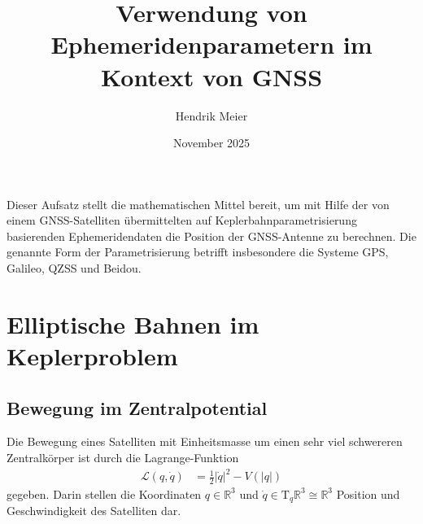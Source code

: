 \documentclass[10pt,a4paper]{article}
\title{Verwendung von Ephemeridenparametern im Kontext von GNSS}
\author{Hendrik Meier}
\affil{Oberuhldingen}
\date{November 2025}
\begin{document}
\maketitle

Dieser Aufsatz stellt die mathematischen Mittel bereit, um mit Hilfe der von einem GNSS-Satelliten übermittelten auf Keplerbahn\-parametrisierung basierenden Ephemeridendaten die Position der GNSS-Antenne zu berechnen.
Die genannte Form der Parametrisierung betrifft insbesondere die Systeme GPS, Galileo, QZSS und Beidou.


\section{Elliptische Bahnen im Keplerproblem}

\subsection{Bewegung im Zentralpotential}

Die Bewegung eines Satelliten mit Einheitsmasse um einen sehr viel schwereren Zentralkörper ist durch die Lagrange-Funktion
\begin{align}
	\mathcal{L}(q, \dot{q}) &=
	\frac{1}{2} |\dot{q}|^2 - V(|q|)
\end{align}
gegeben.
Darin stellen die Koordinaten $q\in\mathbb{R}^3$ und $\dot{q}\in\mathrm{T}_q\mathbb{R}^3\cong\mathbb{R}^3$ Position und Geschwindigkeit des Satelliten dar.
\end{document}
